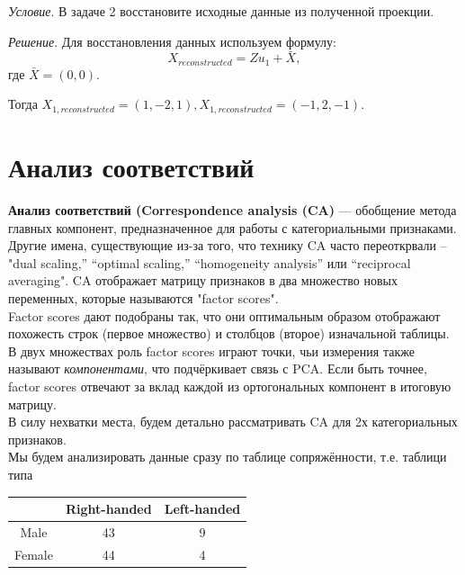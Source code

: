 \textit{Условие}. В задаче 2 восстановите исходные данные из полученной проекции.

\textit{Решение}. Для восстановления данных используем формулу: 
\begin{equation}
    X_{reconstructed} = Zu_1 + \bar{X},
\end{equation}
 где $\bar{X} = (0, 0)$.

 Тогда $X_{1, reconstructed} = (1, -2, 1), X_{1, reconstructed} = (-1, 2, -1)$.


\section{Анализ соответствий}
\textbf{Анализ соответствий (Correspondence analysis (CA)} — обобщение метода главных компонент, предназначенное для работы с
категориальными признаками. Другие имена, существующие из-за того, что технику CA часто переоткрвали -- "dual scaling,” “optimal scaling,” “homogeneity analysis” или “reciprocal averaging". CA отображает матрицу признаков в два множество новых переменных, которые называются "factor scores".\\
Factor scores  дают подобраны так, что они оптимальным образом отображают похожесть строк (первое множество) и столбцов (второе) изначальной таблицы. В двух множествах роль factor scores играют точки, чьи  измерения также называют \textit{компонентами}, что подчёркивает связь с PCA. Если быть точнее, factor scores отвечают за вклад каждой из ортогональных компонент в итоговую матрицу.\\
В силу нехватки места, будем детально рассматривать CA для 2х категориальных признаков.\\
Мы будем анализировать данные сразу по таблице сопряжённости, т.е. таблици типа 
\begin{table}[H]\centering
\begin{tabular}{|c|c|c|}
\hline  & Right-handed & Left-handed  \\
\hline Male & 43 & 9 \\
\hline Female & 44 & 4  \\
\hline
\end{tabular}
\end{table}
